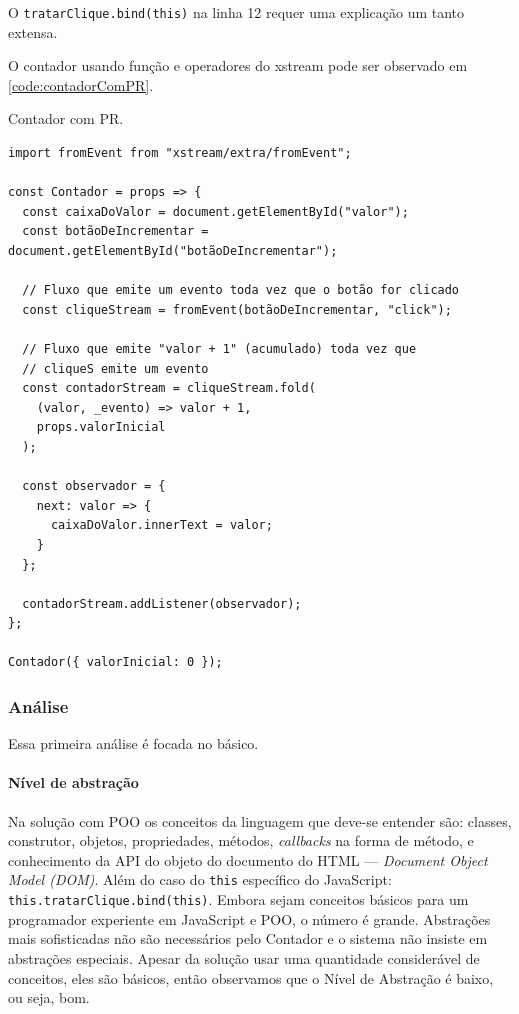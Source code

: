 O \texttt{tratarClique.bind(this)} na linha 12 requer uma explicação um tanto
extensa.

O contador usando função e operadores do xstream pode ser observado em
\ref{code:contadorComPR}.

\begin{listing}[htbp]
\caption{\label{code:contadorComPR}Contador com PR.}
\begin{verbatim}
import fromEvent from "xstream/extra/fromEvent";

const Contador = props => {
  const caixaDoValor = document.getElementById("valor");
  const botãoDeIncrementar = document.getElementById("botãoDeIncrementar");

  // Fluxo que emite um evento toda vez que o botão for clicado
  const cliqueStream = fromEvent(botãoDeIncrementar, "click");

  // Fluxo que emite "valor + 1" (acumulado) toda vez que
  // cliqueS emite um evento
  const contadorStream = cliqueStream.fold(
    (valor, _evento) => valor + 1,
    props.valorInicial
  );

  const observador = {
    next: valor => {
      caixaDoValor.innerText = valor;
    }
  };

  contadorStream.addListener(observador);
};

Contador({ valorInicial: 0 });
\end{verbatim}
\end{listing}

\subsubsection{Análise}
\label{sec:org81db0a6}

Essa primeira análise é focada no básico.

\paragraph{Nível de abstração}
\label{sec:org00357e4}
Na solução com POO os conceitos da linguagem que deve-se entender são:
classes, construtor, objetos, propriedades, métodos, \emph{callbacks} na forma
de método, e conhecimento da API do objeto do documento do HTML ---
\emph{Document Object Model (DOM)}.
Além do caso do \texttt{this} específico do JavaScript:
\texttt{this.tratarClique.bind(this)}.
Embora sejam conceitos básicos para um programador experiente em JavaScript
e POO, o número é grande.
Abstrações mais sofisticadas não são necessários pelo Contador e o sistema
não insiste em abstrações especiais.
Apesar da solução usar uma quantidade considerável de conceitos, eles são
básicos, então observamos que o Nível de Abstração é baixo, ou seja, bom.

